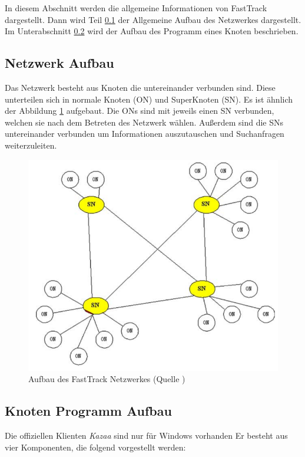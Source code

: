 In diesem Abschnitt werden die allgemeine Informationen von FastTrack dargestellt.
Dann wird Teil \ref{subsec:netAuf} der Allgemeine Aufbau des Netzwerkes dargestellt. 
Im Unterabschnitt \ref{subsec:proAuf} wird der Aufbau des Programm eines Knoten beschrieben.

\subsection{Netzwerk Aufbau}
\label{subsec:netAuf}

Das Netzwerk besteht aus Knoten die untereinander verbunden sind.
Diese unterteilen sich in normale Knoten (ON) und SuperKnoten (SN).
Es ist ähnlich der Abbildung \ref{fig:auf} aufgebaut.
Die ONs sind mit jeweils einen SN verbunden, welchen sie nach dem Betreten des Netzwerk wählen.
Außerdem sind die SNs untereinander verbunden um Informationen auszutauschen und Suchanfragen weiterzuleiten.

\begin{figure}
\includegraphics[scale=0.3]{gfx/aufbau}
\caption{Aufbau des FastTrack Netzwerkes (Quelle \cite{liang2006fasttrack})}
\label{fig:auf}
\end{figure}

\subsection{Knoten Programm Aufbau}
\label{subsec:proAuf}

Die offiziellen Klienten \textit{Kazaa}\cite{kazaa} sind nur für Windows vorhanden
Er besteht aus vier Komponenten, die folgend vorgestellt werden:

